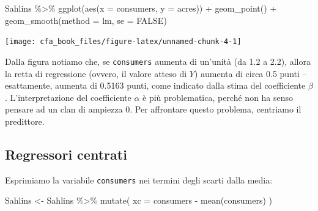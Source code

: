 \documentclass[
  11pt,
]{krantz}
\makeatletter
\newenvironment{Shaded}{\begin{snugshade}}{\end{snugshade}}
\newcommand{\AttributeTok}[1]{\textcolor[rgb]{0.61,0.61,0.61}{#1}}
\newcommand{\CommentTok}[1]{\textcolor[rgb]{0.37,0.37,0.37}{\textit{#1}}}
\newcommand{\ConstantTok}[1]{\textcolor[rgb]{0,0,0}{#1}}
\newcommand{\FunctionTok}[1]{\textcolor[rgb]{0,0,0}{#1}}
\newcommand{\NormalTok}[1]{#1}
\newcommand{\OtherTok}[1]{\textcolor[rgb]{0.37,0.37,0.37}{#1}}
\newcommand{\SpecialCharTok}[1]{\textcolor[rgb]{0,0,0}{#1}}
\newenvironment{kframe}{%
\medskip{}
\setlength{\fboxsep}{.8em}
 \def\at@end@of@kframe{}%
 \ifinner\ifhmode%
  \def\at@end@of@kframe{\end{minipage}}%
  \begin{minipage}{\columnwidth}%
 \fi\fi%
 \def\FrameCommand##1{\hskip\@totalleftmargin \hskip-\fboxsep
 \colorbox{shadecolor}{##1}\hskip-\fboxsep
     \hskip-\linewidth \hskip-\@totalleftmargin \hskip\columnwidth}%
 \MakeFramed {\advance\hsize-\width
   \@totalleftmargin\z@ \linewidth\hsize
   \@setminipage}}%
 {\par\unskip\endMakeFramed%
 \at@end@of@kframe}
\renewenvironment{Shaded}{\begin{kframe}}{\end{kframe}}
\makeatother
\begin{document}
\begin{Shaded}
\begin{Highlighting}[]
\NormalTok{Sahlins }\SpecialCharTok{\%\textgreater{}\%}
  \FunctionTok{ggplot}\NormalTok{(}\FunctionTok{aes}\NormalTok{(}\AttributeTok{x =}\NormalTok{ consumers, }\AttributeTok{y =}\NormalTok{ acres)) }\SpecialCharTok{+}
  \FunctionTok{geom\_point}\NormalTok{() }\SpecialCharTok{+}
  \FunctionTok{geom\_smooth}\NormalTok{(}\AttributeTok{method =}\NormalTok{ lm, }\AttributeTok{se =} \ConstantTok{FALSE}\NormalTok{)}
\end{Highlighting}
\end{Shaded}

\begin{center}\texttt{[image: cfa\_book\_files/figure-latex/unnamed-chunk-4-1]} \end{center}

\begin{Shaded}
\end{Shaded}

Dalla figura notiamo che, se \texttt{consumers} aumenta di un'unità (da 1.2 a 2.2), allora la retta di regressione (ovvero, il valore atteso di \(Y\)) aumenta di circa 0.5 punti -- esattamente, aumenta di 0.5163 punti, come indicato dalla stima del coefficiente \(\beta\). L'interpretazione del coefficiente \(\alpha\) è più problematica, perché non ha senso pensare ad un clan di ampiezza 0. Per affrontare questo problema, centriamo il predittore.

\hypertarget{regressori-centrati}{%
\subsection{Regressori centrati}\label{regressori-centrati}}

Esprimiamo la variabile \texttt{consumers} nei termini degli scarti dalla media:

\begin{Shaded}
\begin{Highlighting}[]
\NormalTok{Sahlins }\OtherTok{\textless{}{-}}\NormalTok{ Sahlins }\SpecialCharTok{\%\textgreater{}\%}
  \FunctionTok{mutate}\NormalTok{(}
    \AttributeTok{xc =}\NormalTok{ consumers }\SpecialCharTok{{-}} \FunctionTok{mean}\NormalTok{(consumers)}
\NormalTok{  )}
\end{Highlighting}
\end{Shaded}
\end{document}
